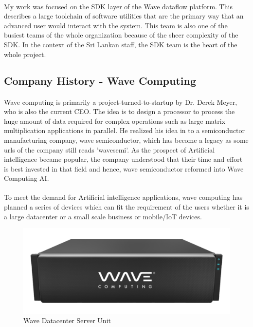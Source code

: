 \paragraph{}
My work was focused on the SDK layer of the Wave dataflow platform. This describes a large toolchain of software utilities that are the primary way that an advanced user would interact with the system. This team is also one of the busiest teams of the whole organization because of the sheer complexity of the SDK. In the context of the Sri Lankan staff, the SDK team is the heart of the whole project.


\subsection{Company History - Wave Computing}

\paragraph{}
Wave computing is primarily a project-turned-to-startup by Dr. Derek Meyer, who is also the current CEO. The idea is to design a processor to process the huge amount of data required for complex operations such as large matrix multiplication applications in parallel. He realized his idea in to a semiconductor manufacturing company, wave semiconductor, which has become a legacy as some urls of the company still reads 'wavesemi'. As the prospect of Artificial intelligence became popular, the company understood that their time and effort is best invested in that field and hence, wave semiconductor reformed into Wave Computing AI.

\paragraph{}
To meet the demand for Artificial intelligence applications, wave computing has planned a series of devices which can fit the requirement of the users whether it is a large datacenter or a small scale business or mobile/{IoT} devices.
\begin{figure}[h]
    \centering
    \includegraphics[trim=0cm 0cm 0cm 0cm, clip=true,scale=0.5]{figures/wave_server.png}
    \caption{Wave Datacenter Server Unit\label{Fig:waveserver}}\vspace{-4mm}
    \end{figure}


